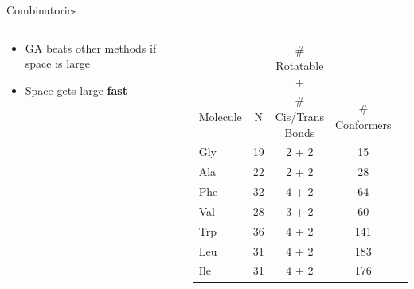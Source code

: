 \documentclass[10pt]{beamer}
\begin{document}
{{%
\begin{frame}{Combinatorics}
	\begin{columns}[c] %
		\begin{column}{.3\textwidth}
			\begin{itemize}
				\item {GA beats other methods if space is large}
				\item {Space gets large \textbf{\alert{fast}}}
			\end{itemize}
		\end{column}
		\hfill
		\begin{column}{0.8\textwidth}
            \begin{tabular}{l c c c r}
                     &    & \# Rotatable +     &               \\
            Molecule & N  & \# Cis/Trans Bonds & \# Conformers \\
            \midrule
            Gly & 19 & 2 + 2 & 15  \\
            Ala & 22 & 2 + 2 & 28  \\
            Phe & 32 & 4 + 2 & 64  \\
            Val & 28 & 3 + 2 & 60  \\
            Trp & 36 & 4 + 2 & 141 \\
            Leu & 31 & 4 + 2 & 183 \\
            Ile & 31 & 4 + 2 & 176 \\
            \end{tabular}
		\end{column}
	\end{columns}
\end{frame}
}

}
\end{document}
